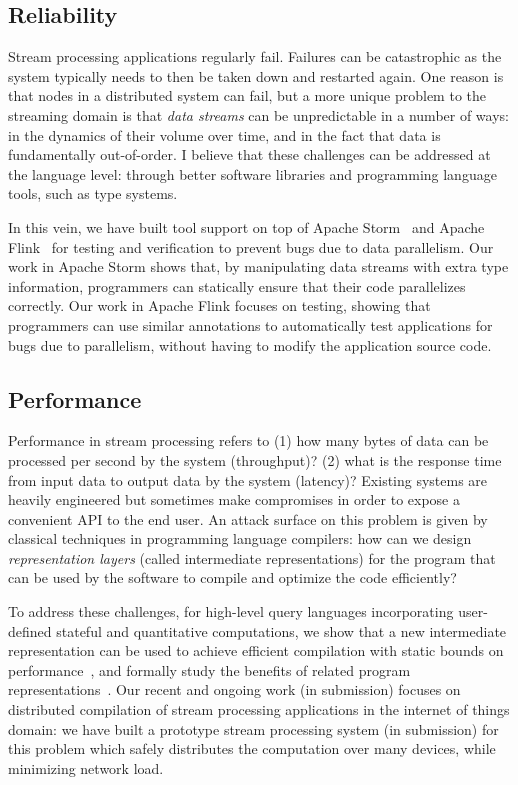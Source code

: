 \documentclass{article}
\begin{document}
\subsection*{Reliability}

Stream processing applications regularly fail.
Failures can be catastrophic as the system typically needs to then be
taken down and restarted again.
One reason is that nodes in a distributed system can fail,
but a more unique problem to the streaming domain is that
\emph{data streams} can be unpredictable in a number of ways:
in the dynamics of their volume over time, and in the fact
that data is fundamentally out-of-order.
I believe that these challenges can be addressed at the language level:
through better software libraries and programming language tools, such as type systems.

In this vein, we have built tool support on top of Apache Storm~\cite{pldi19} and Apache Flink~\cite{oopsla20} for testing and verification to prevent bugs due to data parallelism. Our work in Apache Storm shows that, by manipulating data streams with extra type information, programmers can statically ensure that their code parallelizes correctly. Our work in Apache Flink focuses on testing, showing that programmers can use similar annotations to automatically test applications for bugs due to parallelism, without having to modify the application source code.

\subsection*{Performance}

Performance in stream processing refers to (1) how many bytes of data can be processed per second by the system (throughput)? (2) what is the response time from input data to output data by the system (latency)?
Existing systems are heavily engineered but sometimes make compromises
in order to expose a convenient API to the end user.
An attack surface on this problem is given by classical techniques in programming language compilers: how can we design \emph{representation layers} (called intermediate representations) for the program that can be used by the software to compile and optimize the code efficiently?

To address these challenges,
for high-level query languages incorporating user-defined stateful and quantitative computations, we show that a new intermediate representation can be used to achieve efficient compilation with static bounds on performance~\cite{popl19}, and formally study the benefits of related program representations~\cite{icalp17,tcs20}. Our recent and ongoing work (in submission) focuses on distributed compilation of stream processing applications in the internet of things domain: we have built a prototype stream processing system (in submission) for this problem which safely distributes the computation over many devices, while minimizing network load.
\end{document}
